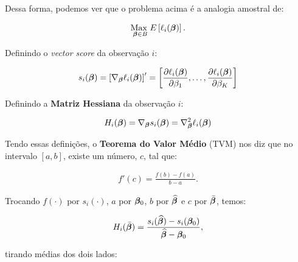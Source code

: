 \documentclass[11pt,oneside,a4paper]{article}
\numberwithin{equation}{section}
\begin{document}
\begin{description}
\begin{description}
Dessa forma, podemos ver que o problema acima é a analogia amostral de:

\vspace{-1 em}
\begin{align*}
\underset{\boldsymbol{\beta} \in B}{\text{Max }} 
E \left[ 
\ell_{i} ( \boldsymbol{\beta} )
\right].
\end{align*}

Definindo o \textit{vector score} da observação $i$:

\vspace{-1 em}
\begin{align*}
s_{i} (\boldsymbol{\beta}) = 
\left[ \nabla_{\boldsymbol{\beta}} \ell_{i} (\boldsymbol{\beta}) \right]'
=
\begin{bmatrix}
	\dfrac{\partial{\ell_{i} (\boldsymbol{\beta})}}{\partial{\beta_{1}}},
	\dots,
	\dfrac{\partial{\ell_{i} (\boldsymbol{\beta})}}{\partial{\beta_{K}}}
\end{bmatrix}
\end{align*}

Definindo a \textbf{Matriz Hessiana} da observação $i$:

\vspace{-1 em}
\begin{align*}
H_{i} (\boldsymbol{\beta}) = 
\nabla_{\boldsymbol{\beta}} s_{i} (\boldsymbol{\beta}) = 
\nabla_{\boldsymbol{\beta}}^2 \ell_{i} (\boldsymbol{\beta})
\end{align*}

Tendo essas definições, o \textbf{Teorema do Valor Médio} (TVM) nos diz que no intervalo $[a, b]$, existe um número, $c$, tal que:

\vspace{-1 em}
\begin{align*}
	f'(c) = \frac{f(b) - f(a)}{b - a}.
\end{align*}

\begin{center}
\end{center}

Trocando 
$f(\cdot)$ por $s_{i}(\cdot)$, 
$a$ por $\boldsymbol{\beta}_{0}$, 
$b$ por $\widehat{\boldsymbol{\beta}}$ e
$c$ por $\bar{\boldsymbol{\beta}}$,
temos:

\vspace{-1 em}
\begin{align*}
H_{i} ( \bar{\boldsymbol{\beta}} ) =
\frac{s_{i}( \widehat{\boldsymbol{\beta}} ) - s_{i}( \boldsymbol{\beta}_{0} )}{\widehat{\boldsymbol{\beta}} - \boldsymbol{\beta}_{0}},
\end{align*}

\noindent
tirando médias dos dois lados:


\end{description}
\end{description}
\end{document}
